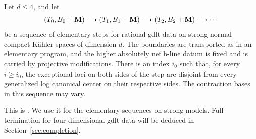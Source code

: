 \begin{theorem}\label{thm:special-termination}
Let \(d\leq4\), and let
\[
 (T_0,B_0+\mathbf{M})\dashrightarrow(T_1,B_1+\mathbf{M})
 \dashrightarrow(T_2,B_2+\mathbf{M})\dashrightarrow\cdots
\]
be a sequence of elementary steps for rational gdlt data on strong normal
compact K\"ahler spaces of dimension \(d\).  The boundaries are transported
as in an elementary program, and the higher absolutely nef b-line datum is fixed and is
carried by projective modifications.  There is an index \(i_0\) such that,
for every \(i\geq i_0\), the exceptional loci on both sides of the step are
disjoint from every generalized log canonical center on their respective
sides.  The contraction bases in this sequence may vary.
\end{theorem}

This is \cite[Theorem~11.3]{KahlerAuxiliary}.  We use it for the elementary
sequences on strong models.  Full termination for four-dimensional gdlt
data will be deduced in Section~\ref{sec:completion}.
